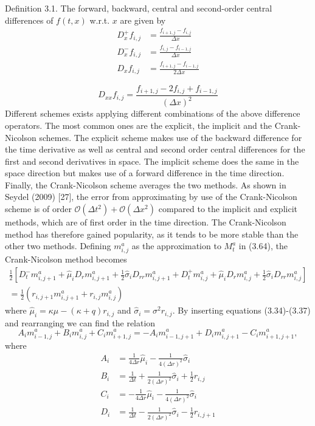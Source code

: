 \documentclass[12pt,twoside]{reedthesis}
\begin{document}
Definition 3.1. The forward, backward, central and second-order central differences of \(f(t, x)\) w.r.t. \(x\) are given by
\[
\begin{aligned}
D_{x}^{+} f_{i, j} &=\frac{f_{i+1, j}-f_{i, j}}{\Delta x} \\
D_{x}^{-} f_{i, j} &=\frac{f_{i, j}-f_{i-1, j}}{\Delta x} \\
D_{x} f_{i, j} &=\frac{f_{i+1, j}-f_{i-1, j}}{2 \Delta x}
\end{aligned}
\]

\[
D_{x x} f_{i, j}=\frac{f_{i+1, j}-2 f_{i, j}+f_{i-1, j}}{(\Delta x)^{2}}
\]
Different schemes exists applying different combinations of the above difference operators. The most common ones are the explicit, the implicit and the Crank-Nicolson schemes. The explicit scheme makes use of the backward difference for the time derivative as well as central and second order central differences for the first and second derivatives in space. The implicit scheme does the same in the space direction but makes use of a forward difference in the time direction. Finally, the Crank-Nicolson scheme averages the two methods. As shown in Seydel (2009) {[}27{]}, the error from approximating by use of the Crank-Nicolson scheme is of order \(\mathcal{O}\left(\Delta t^{2}\right)+\mathcal{O}\left(\Delta x^{2}\right)\) compared to the implicit and explicit methods, which are of first order in the time direction. The Crank-Nicolson method has therefore gained popularity, as it tends to be more stable than the other two methods. Defining \(m_{i, j}^{a}\) as the approximation to \(M_{t}^{a}\) in (3.64), the Crank-Nicolson method becomes
\[
\begin{array}{r}
\frac{1}{2}\left[D_{t}^{-} m_{i, j+1}^{a}+\hat{\mu}_{i} D_{r} m_{i, j+1}^{a}+\frac{1}{2} \hat{\sigma}_{i} D_{r r} m_{i, j+1}^{a}+D_{t}^{+} m_{i, j}^{a}+\hat{\mu}_{i} D_{r} m_{i, j}^{a}+\frac{1}{2} \hat{\sigma}_{i} D_{r r} m_{i, j}^{a}\right] \\
=\frac{1}{2}\left(r_{i, j+1} m_{i, j+1}^{a}+r_{i, j} m_{i, j}^{a}\right)
\end{array}
\]
where \(\hat{\mu}_{i}=\kappa \mu-(\kappa+q) r_{i, j}\) and \(\hat{\sigma}_{i}=\sigma^{2} r_{i, j}\). By inserting equations (3.34)-(3.37) and rearranging we can find the relation
\[
A_{i} m_{i-1, j}^{a}+B_{i} m_{i, j}^{a}+C_{i} m_{i+1, j}^{a}=-A_{i} m_{i-1, j+1}^{a}+D_{i} m_{i, j+1}^{a}-C_{i} m_{i+1, j+1}^{a},
\]
where
\[
\begin{aligned}
A_{i} &=\frac{1}{4 \Delta r} \hat{\mu}_{i}-\frac{1}{4(\Delta r)^{2}} \hat{\sigma}_{i} \\
B_{i} &=\frac{1}{\Delta t}+\frac{1}{2(\Delta r)^{2}} \hat{\sigma}_{i}+\frac{1}{2} r_{i, j} \\
C_{i} &=-\frac{1}{4 \Delta r} \hat{\mu}_{i}-\frac{1}{4(\Delta r)^{2}} \hat{\sigma}_{i} \\
D_{i} &=\frac{1}{\Delta t}-\frac{1}{2(\Delta r)^{2}} \hat{\sigma}_{i}-\frac{1}{2} r_{i, j+1}
\end{aligned}
\]
\end{document}
